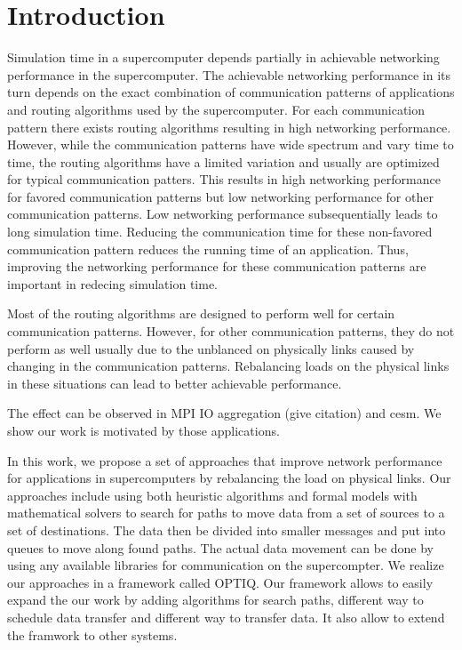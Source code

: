 \section{Introduction}
\label{sec:intro}
Simulation time in a supercomputer depends partially in achievable networking performance in the supercomputer. The achievable networking performance in its turn depends on the exact combination of communication patterns of applications and routing algorithms used by the supercomputer. For each communication pattern there exists routing algorithms resulting in high networking performance. However, while the communication patterns have wide spectrum and vary time to time, the routing algorithms have a limited variation and usually are optimized for typical communication patters. This results in high networking performance for favored communication patterns but low networking performance for other communication patterns. Low networking performance subsequentially leads to long simulation time. Reducing the communication time for these non-favored communication pattern reduces the running time of an application. Thus, improving the networking performance for these communication patterns are important in redecing simulation time. 

Most of the routing algorithms are designed to perform well for certain communication patterns. However, for other communication patterns, they do not perform as well usually due to the unblanced on physically links caused by changing in the communication patterns. Rebalancing loads on the physical links in these situations can lead to better achievable performance. 

The effect can be observed in MPI IO aggregation (give citation) and cesm. We show our work is motivated by those applications.

In this work, we propose a set of approaches that improve network performance for applications in supercomputers by rebalancing the load on physical links. Our approaches include using both heuristic algorithms and formal models with mathematical solvers to search for paths to move data from a set of sources to a set of destinations. The data then be divided into smaller messages and put into queues to move along found paths. The actual data movement can be done by using any available libraries for communication on the supercompter. We realize our approaches in a framework called OPTIQ. Our framework allows to easily expand the our work by adding algorithms for search paths, different way to schedule data transfer and different way to transfer data. It also allow to extend the framwork to other systems.

